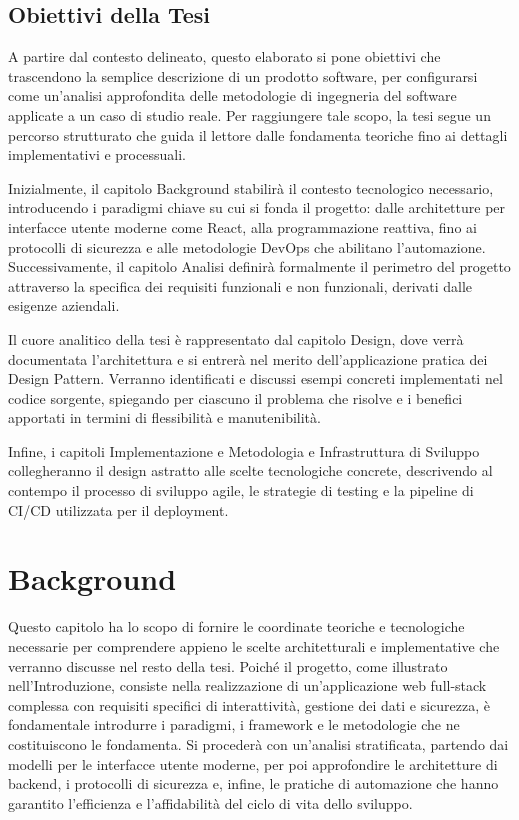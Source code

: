\documentclass[12pt,a4paper,openright,twoside]{book}
\begin{document}
\section{Obiettivi della Tesi}
\label{sec:obiettivi_tesi}

A partire dal contesto delineato, questo elaborato si pone obiettivi che trascendono la semplice descrizione di un prodotto software, per configurarsi come un'analisi approfondita delle metodologie di ingegneria del software applicate a un caso di studio reale. Per raggiungere tale scopo, la tesi segue un percorso strutturato che guida il lettore dalle fondamenta teoriche fino ai dettagli implementativi e processuali.

Inizialmente, il capitolo Background stabilirà il contesto tecnologico necessario, introducendo i paradigmi chiave su cui si fonda il progetto: dalle architetture per interfacce utente moderne come React, alla programmazione reattiva, fino ai protocolli di sicurezza e alle metodologie DevOps che abilitano l'automazione. Successivamente, il capitolo Analisi definirà formalmente il perimetro del progetto attraverso la specifica dei requisiti funzionali e non funzionali, derivati dalle esigenze aziendali.

Il cuore analitico della tesi è rappresentato dal capitolo Design, dove verrà documentata l'architettura e si entrerà nel merito dell'applicazione pratica dei Design Pattern. Verranno identificati e discussi esempi concreti implementati nel codice sorgente, spiegando per ciascuno il problema che risolve e i benefici apportati in termini di flessibilità e manutenibilità.

Infine, i capitoli Implementazione e Metodologia e Infrastruttura di Sviluppo collegheranno il design astratto alle scelte tecnologiche concrete, descrivendo al contempo il processo di sviluppo agile, le strategie di testing e la pipeline di CI/CD utilizzata per il deployment.

\chapter{Background}
\label{chap:background}

Questo capitolo ha lo scopo di fornire le coordinate teoriche e tecnologiche necessarie per comprendere appieno le scelte architetturali e implementative che verranno discusse nel resto della tesi. Poiché il progetto, come illustrato nell'Introduzione, consiste nella realizzazione di un'applicazione web full-stack complessa con requisiti specifici di interattività, gestione dei dati e sicurezza, è fondamentale introdurre i paradigmi, i framework e le metodologie che ne costituiscono le fondamenta. Si procederà con un'analisi stratificata, partendo dai modelli per le interfacce utente moderne, per poi approfondire le architetture di backend, i protocolli di sicurezza e, infine, le pratiche di automazione che hanno garantito l'efficienza e l'affidabilità del ciclo di vita dello sviluppo.
\end{document}
